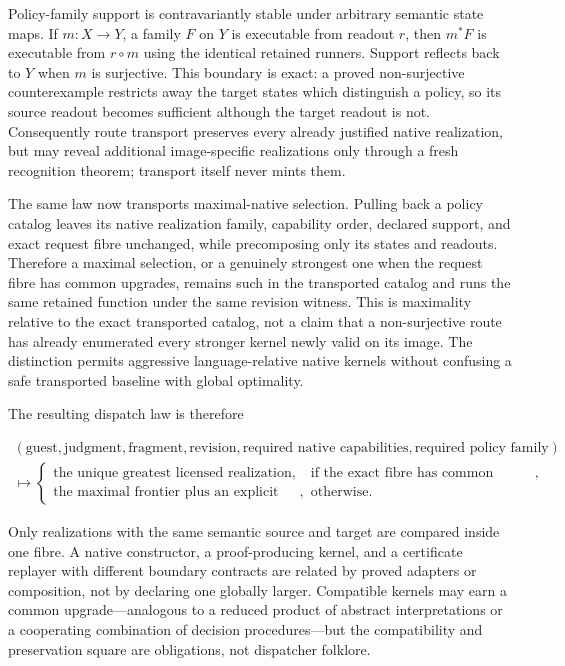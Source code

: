 \documentclass[11pt]{article}
\begin{document}
Policy-family support is contravariantly stable under arbitrary semantic state
maps.  If $m:X\to Y$, a family $F$ on $Y$ is executable from readout $r$, then
$m^*F$ is executable from $r\circ m$ using the identical retained runners.
Support reflects back to $Y$ when $m$ is surjective.  This boundary is exact:
a proved non-surjective counterexample restricts away the target states which
distinguish a policy, so its source readout becomes sufficient although the
target readout is not.  Consequently route transport preserves every already
justified native realization, but may reveal additional image-specific
realizations only through a fresh recognition theorem; transport itself never
mints them.

The same law now transports maximal-native selection.  Pulling back a policy
catalog leaves its native realization family, capability order, declared
support, and exact request fibre unchanged, while precomposing only its states
and readouts.  Therefore a maximal selection, or a genuinely strongest one
when the request fibre has common upgrades, remains such in the transported
catalog and runs the same retained function under the same revision witness.
This is maximality relative to the exact transported catalog, not a claim that
a non-surjective route has already enumerated every stronger kernel newly valid
on its image.  The distinction permits aggressive language-relative native
kernels without confusing a safe transported baseline with global optimality.

The resulting dispatch law is therefore

\[
\begin{gathered}
  (\text{guest},\text{judgment},\text{fragment},\text{revision},
    \text{required native capabilities},\text{required policy family})\\[-0.2ex]
  \longmapsto
  \begin{cases}
    \text{the unique greatest licensed realization},
      &\text{if the exact fibre has common upgrades},\\
    \text{the maximal frontier plus an explicit policy},
      &\text{otherwise.}
  \end{cases}
\end{gathered}
\]

Only realizations with the same semantic source and target are compared inside
one fibre.  A native constructor, a proof-producing kernel, and a certificate
replayer with different boundary contracts are related by proved adapters or
composition, not by declaring one globally larger.  Compatible kernels may earn
a common upgrade---analogous to a reduced product of abstract interpretations or
a cooperating combination of decision procedures---but the compatibility and
preservation square are obligations, not dispatcher folklore.
\end{document}
